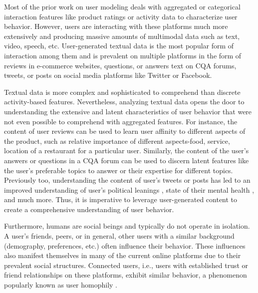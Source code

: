 Most of the prior work on user modeling deals with aggregated or categorical interaction features like product ratings or activity data to characterize user behavior. However, users are interacting with these platforms much more extensively and producing massive amounts of multimodal data such as text, video, speech, etc. User-generated textual data is the most popular form of interaction among them and is prevalent on multiple platforms in the form of reviews in e-commerce websites, questions, or answers text on CQA forums, tweets, or posts on social media platforms like Twitter or Facebook.

Textual data is more complex and sophisticated to comprehend than discrete activity-based features. Nevertheless, analyzing textual data opens the door to understanding the extensive and latent characteristics of user behavior that were not even possible to comprehend with aggregated features. For instance, the content of user reviews can be used to learn user affinity to different aspects of the product, such as relative importance of different aspects-food, service, location of a restaurant for a particular user.
Similarly, the content of the user's answers or questions in a CQA forum can be used to discern latent features like the user's preferable topics to answer or their expertise for different topics. Previously too, understanding the content of user's tweets or posts has led to an improved understanding of user's political leanings \cite{political}, state of their mental health \cite{mentalhealth}, and much more. Thus, it is imperative to leverage user-generated content to create a comprehensive understanding of user behavior.

Furthermore, humans are social beings and typically do not operate in isolation. %
A user's friends, peers, or in general, other users with a similar background (demography, preferences, etc.) often influence their behavior.
These influences also manifest themselves in many of the current online platforms due to their prevalent social structures. Connected users, i.e., users with established trust or friend relationships on these platforms, exhibit similar behavior, a phenomenon popularly known as user homophily \cite{Tang:2009}.

